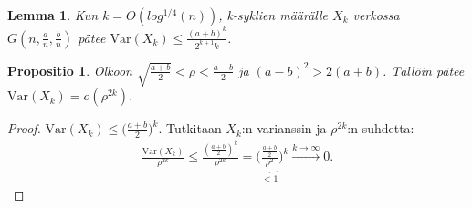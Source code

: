 \documentclass[finnish,12pt,a4paper,pdftex,sci,utf8]{aaltothesis}
\newtheorem{lemma}{Lemma}
\newtheorem{propositio}{Propositio}
\begin{document}
\begin{lemma}
	\label{lemma:var_yläraja}
	Kun $k = O(log^{1/4}(n))$, k-syklien määrälle $X_k$ verkossa $G(n, \frac{a}{n}, \frac{b}{n})$ pätee $\text{Var}(X_k) \leq \frac{(a+b)^k}{2^{k+1}k}$. \cite{reconstruction}
\end{lemma}

\begin{propositio}
	Olkoon $\sqrt{\frac{a+b}{2}} < \rho < \frac{a-b}{2}$ ja $(a-b)^2 > 2(a+b)$. Tällöin pätee $\text{Var}(X_k) = o(\rho^{2k})$.
\end{propositio}
\begin{proof}
	 $\text{Var}(X_k) \leq \big( \frac{a+b}{2} \big)^{k}$. Tutkitaan $X_k$:n varianssin ja $\rho^{2k}$:n suhdetta:
	\begin{align*}
		\frac{\text{Var}(X_k)}{\rho^{2k}} \leq \frac{ (\frac{a+b}{2})^k}{ \rho^{2k}} = \big( \underbrace{ \frac{ \frac{a+b}{2}}{ \rho^{2}} }_{ < 1} \big)^k \xrightarrow{k \rightarrow \infty} 0.
	\end{align*}
\end{proof}
\end{document}
